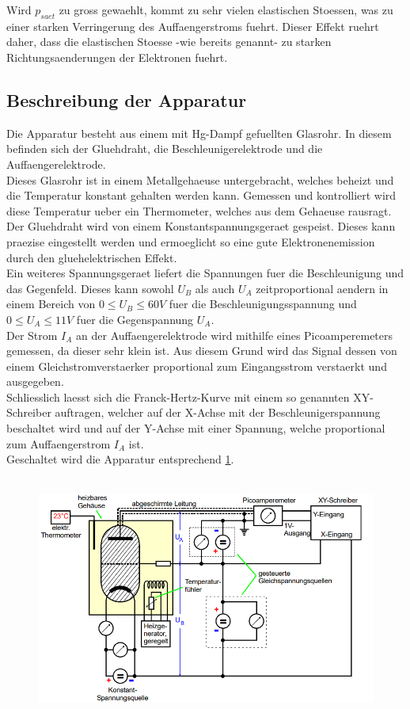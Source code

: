\documentclass[titlepage=firstcover, captions=tableheading]{scrartcl}
\begin{document}
Wird $p_{saet}$ zu gross gewaehlt, kommt zu sehr vielen elastischen Stoessen, was zu einer starken Verringerung des Auffaengerstroms fuehrt. Dieser Effekt ruehrt daher, dass die elastischen Stoesse -wie bereits genannt- zu starken Richtungsaenderungen der Elektronen fuehrt.
\subsection{Beschreibung der Apparatur}
Die Apparatur besteht aus einem mit Hg-Dampf gefuellten Glasrohr. In diesem befinden sich der Gluehdraht, die Beschleunigerelektrode und die Auffaengerelektrode.\\
Dieses Glasrohr ist in einem Metallgehaeuse untergebracht, welches beheizt und die Temperatur konstant gehalten werden kann. Gemessen und kontrolliert wird diese Temperatur ueber ein Thermometer, welches aus dem Gehaeuse rausragt.\\
Der Gluehdraht wird von einem Konstantspannungsgeraet gespeist. Dieses kann praezise eingestellt werden und ermoeglicht so eine gute Elektronenemission durch den gluehelektrischen Effekt.\\
Ein weiteres Spannungsgeraet liefert die Spannungen fuer die Beschleunigung und das Gegenfeld. Dieses kann sowohl $U_B$ als auch $U_A$ zeitproportional aendern in einem Bereich von $0\leq U_B\leq 60V$ fuer die Beschleunigungsspannung und $0\leq U_A\leq 11V$ fuer die Gegenspannung $U_A$.\\
Der Strom $I_A$ an der Auffaengerelektrode wird mithilfe eines Picoamperemeters gemessen, da dieser sehr klein ist. Aus diesem Grund wird das Signal dessen von einem Gleichstromverstaerker proportional zum Eingangsstrom verstaerkt und ausgegeben.\\
Schliesslich laesst sich die Franck-Hertz-Kurve mit einem so genannten XY-Schreiber auftragen, welcher auf der X-Achse mit der Beschleunigerspannung beschaltet wird und auf der Y-Achse mit einer Spannung, welche proportional zum Auffaengerstrom $I_A$ ist.\\
Geschaltet wird die Apparatur entsprechend \ref{Fig:Schaltung}.
\begin{figure}[H]
    \centering
    \captionsetup{justification=centering}
    \includegraphics[height=8cm]{"Schaltung_FranckHertz.png"}
    \label{Fig:Schaltung}
\end{figure}
\end{document}
